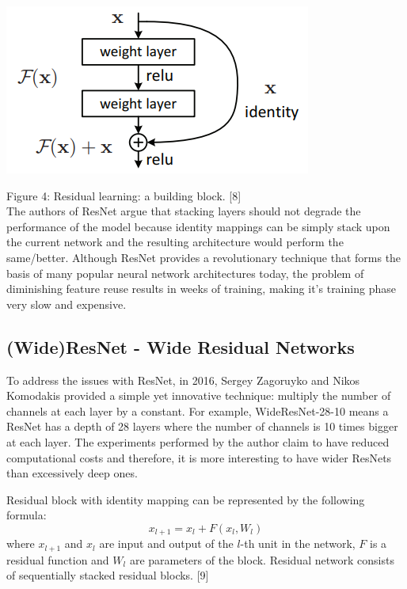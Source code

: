 \documentclass[conference]{IEEEtran}
\begin{document}
\begin{center}
    \includegraphics[scale=0.7]{ResNet.PNG}\\
\end{center}
Figure 4: Residual learning: a building block. [8]\\

The authors of ResNet argue that stacking layers should not degrade the performance of the model because identity mappings can be simply stack upon the current network and the resulting architecture would perform the same/better. Although ResNet provides a revolutionary technique that forms the basis of many popular neural network architectures today, the problem of diminishing feature reuse results in weeks of training, making it's training phase very slow and expensive.

\subsection{\textbf{(Wide)ResNet - Wide Residual Networks}}
To address the issues with ResNet, in 2016, Sergey Zagoruyko and Nikos Komodakis provided a simple yet innovative technique: multiply the number of channels at each layer by a constant. For example, WideResNet-28-10 means a ResNet has a depth of 28 layers where the number of channels is 10 times bigger at each layer. The experiments performed by the author claim to have reduced computational costs and therefore, it is more interesting to have wider ResNets than excessively deep ones.

Residual block with identity mapping can be represented by the following formula:
\[x_{l+1} = x_l +F(x_l,W_l)\]
where $x_{l+1}$ and $x_l$ are input and output of the $l$-th unit in the network, $F$ is a residual function and $W_l$ are parameters of the block. Residual network consists of sequentially stacked residual blocks. [9]
\end{document}
